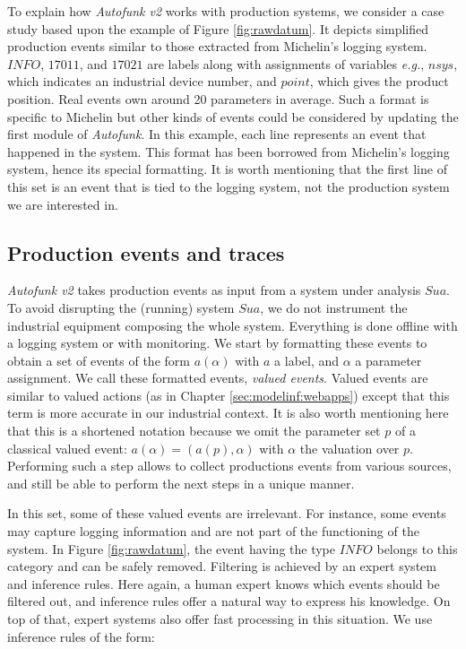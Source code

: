 \begin{example}
To explain how \textit{Autofunk v2} works with production
systems, we consider a case study based upon the example of
Figure \ref{fig:rawdatum}. It depicts simplified production
events similar to those extracted from Michelin's logging system.
$INFO$, $17011$, and $17021$ are labels along with assignments of
variables \emph{e.g.}, $nsys$, which indicates an industrial
device number, and $point$, which gives the product position.
Real events own around 20 parameters in average. Such a format is
specific to Michelin but other kinds of events could be
considered by updating the first module of \textit{Autofunk}.  In
this example, each line represents an event that happened in the
system. This format has been borrowed from Michelin's logging
system, hence its special formatting. It is worth mentioning that
the first line of this set is an event that is tied to the
logging system, not the production system we are interested in.
\end{example}

\subsection{Production events and traces}
\label{part3:collecting}

\textit{Autofunk v2} takes production events as input from a
system under analysis $\mathit{Sua}$. To avoid disrupting the
(running) system $\mathit{Sua}$, we do not instrument the
industrial equipment composing the whole system. Everything is
done offline with a logging system or with monitoring. We start
by formatting these events to obtain a set of events of the form
$a(\alpha)$ with $a$ a label, and $\alpha$ a parameter
assignment. We call these formatted events, \textit{valued
events}. Valued events are similar to valued actions (as in
Chapter \ref{sec:modelinf:webapps}) except that this term is more
accurate in our industrial context. It is also worth mentioning
here that this is a shortened notation because we omit the
parameter set $p$ of a classical valued event: $a(\alpha) =
(a(p), \alpha)$ with $\alpha$ the valuation over $p$.  Performing
such a step allows to collect productions events from various
sources, and still be able to perform the next steps in a unique
manner.

In this set, some of these valued events are irrelevant.  For
instance, some events may capture logging information and are not
part of the functioning of the system. In Figure
\ref{fig:rawdatum}, the event having the type $INFO$ belongs to
this category and can be safely removed. Filtering is achieved by
an expert system and inference rules. Here again, a human expert
knows which events should be filtered out, and inference rules
offer a natural way to express his knowledge. On top of that,
expert systems also offer fast processing in this situation. We
use inference rules of the form:

